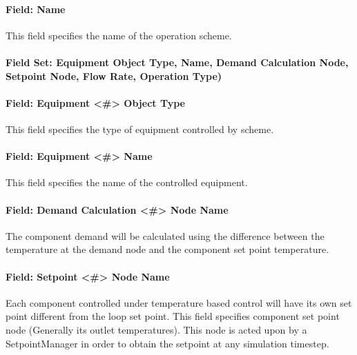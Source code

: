 \paragraph{Field: Name}\label{field-name-6-014}

This field specifies the name of the operation scheme.

\paragraph{Field Set: Equipment Object Type, Name, Demand Calculation Node, Setpoint Node, Flow Rate, Operation Type)}\label{field-set-equipment-object-type-name-demand-calculation-node-setpoint-node-flow-rate-operation-type}

\paragraph{Field: Equipment \textless{}\#\textgreater{} Object Type}\label{field-equipment-object-type}

This field specifies the type of equipment controlled by scheme.

\paragraph{Field: Equipment \textless{}\#\textgreater{} Name}\label{field-equipment-name}

This field specifies the name of the controlled equipment.

\paragraph{Field: Demand Calculation \textless{}\#\textgreater{} Node Name}\label{field-demand-calculation-node-name}

The component demand will be calculated using the difference between the temperature at the demand node and the component set point temperature.

\paragraph{Field: Setpoint \textless{}\#\textgreater{} Node Name}\label{field-setpoint-node-name}

Each component controlled under temperature based control will have its own set point different from the loop set point. This field specifies component set point node (Generally its outlet temperatures). This node is acted upon by a SetpointManager in order to obtain the setpoint at any simulation timestep.

